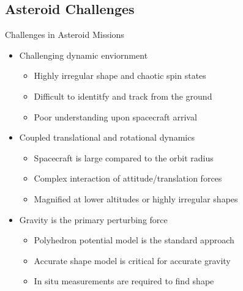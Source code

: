 \documentclass[11pt,professionalfonts,aspectratio=169]{beamer}
\begin{document}
\subsection[Challenges]{Asteroid Challenges}
\begin{frame}{Challenges in Asteroid Missions}
    \begin{itemize}
        \item<1->  Challenging dynamic enviornment
            \begin{itemize}
                \item<1-> Highly irregular shape and chaotic spin states
                \item<1-> Difficult to identitfy and track from the ground
                \item<1-> Poor understanding upon spacecraft arrival
            \end{itemize}
        \item<2-> Coupled translational and rotational dynamics
            \begin{itemize}
                \item Spacecraft is large compared to the orbit radius
                \item Complex interaction of attitude/translation forces
                \item Magnified at lower altitudes or highly irregular shapes
            \end{itemize}
        \item<3-> Gravity is the primary perturbing force
            \begin{itemize}
                \item Polyhedron potential model is the standard approach 
                \item Accurate shape model is critical for accurate gravity
                \item In situ measurements are required to find shape
            \end{itemize}
    \end{itemize}
   
\end{frame}
\end{document}
